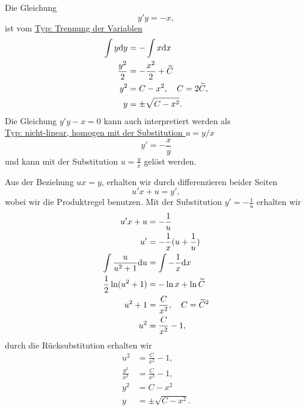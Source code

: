 {\begin{itemize}
Die Gleichung
$$
y'y = -x,
$$
ist vom \underline{Typ: Trennung der Variablen}
\begin{align*}
\int y \mathrm{d} y &= -\int x \mathrm{d} x\\
\frac{y^2}{2} &= -\frac{x^2}{2}+\widetilde C\\
y^2 &= C-x^2, \quad C = 2\widetilde C,\\
y &= \pm \sqrt{C-x^2}.
\end{align*}
Die Gleichung $y'y-x=0$ kann auch interpretiert werden als\\
\underline{Typ: nicht-linear, homogen mit der Substitution $u=y/x$}
$$
y' = -\frac{x}{y}
$$ 
und kann mit der Substitution $u=\frac{y}{x}$ gelöst werden.

Aus der Beziehung $ux = y$, erhalten wir durch differenzieren beider Seiten
$$
u' x + u = y',
$$
wobei wir die Produktregel benutzen.
Mit der Substitution $y'=-\frac{1}{u}$ erhalten wir
\begin{align*}
u'x + u &= - \frac{1}{u}\\
u' &= -\frac{1}{x} (u+\frac{1}{u})\\
\int \frac{u}{u^2+1}\mathrm{d} u &= \int -\frac{1}{x}\mathrm{d} x\\
\frac{1}{2}\ln (u^2+1) &= -\ln x + \ln \widetilde C\\
u^2+1 &= \frac{C}{x^2}, \quad C=\widetilde C^2\\
u^2 &= \frac{C}{x^2}-1,
\end{align*}
durch die Rücksubstitution erhalten wir
\begin{align*}
u^2 &= \frac{C}{x^2}-1,\\
\frac{y^2}{x^2} &= \frac{C}{x^2}-1,\\
y^2 & = C -x^2\\
y&=\pm \sqrt{C-x^2}.
\end{align*}

\end{itemize}
}



